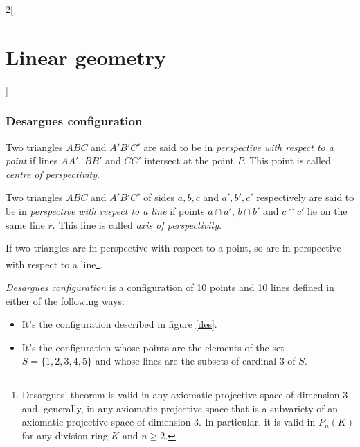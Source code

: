 \documentclass[../../../main.tex]{subfiles}
\begin{document}
\begin{multicols}{2}[\section{Linear geometry}]
    \subsubsection*{Desargues configuration}
    \begin{definition}
        Two triangles $ABC$ and $A'B'C'$ are said to be in \textit{perspective with respect to a point} if lines $AA'$, $BB'$ and $CC'$ intersect at the point $P$. This point is called \textit{centre of perspectivity}.
    \end{definition}
    \begin{definition}
        Two triangles $ABC$ and $A'B'C'$ of sides $a,b,c$ and $a',b',c'$ respectively are said to be in \textit{perspective with respect to a line} if points $a\cap a'$, $b\cap b'$ and $c\cap c'$ lie on the same line $r$. This line is called \textit{axis of perspectivity}.
    \end{definition}
    \begin{theorem}
        If two triangles are in perspective with respect to a point, so are in perspective with respect to a line\footnote{Desargues' theorem is valid in any axiomatic projective space of dimension 3 and, generally, in any axiomatic projective space that is a subvariety of an axiomatic projective space of dimension 3. In particular, it is valid in $P_n(K)$ for any division ring $K$ and $n\geq2$.}.
    \end{theorem}
    \begin{definition}
        \textit{Desargues configuration} is a configuration of 10 points and 10 lines defined in either of the following ways:
        \begin{itemize}
            \item It's the configuration described in figure \ref{des}.
                  \begin{center}
                      \begin{minipage}{\linewidth}
                          \centering
                          
                          \label{des}
                      \end{minipage}
                  \end{center}
            \item It's the configuration whose points are the elements of the set $S=\{1,2,3,4,5\}$ and whose lines are the subsets of cardinal 3 of $S$.

\end{itemize}
\end{definition}
\end{multicols}
\end{document}
